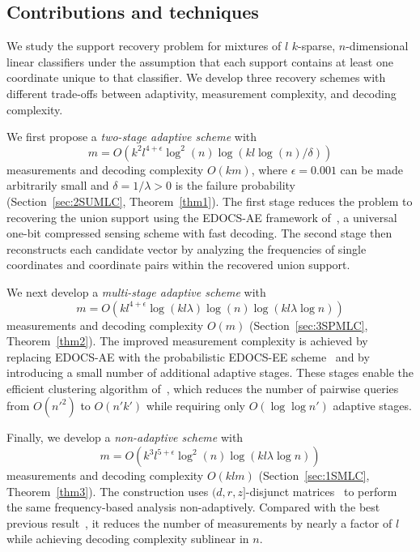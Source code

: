 \documentclass[10pt,a4paper]{amsart}
\begin{document}
\subsection{Contributions and techniques}

We study the support recovery problem for mixtures of $l$ $k$-sparse, $n$-dimensional linear classifiers under the assumption that each support contains at least one coordinate unique to that classifier. We develop three recovery schemes with different trade-offs between adaptivity, measurement complexity, and decoding complexity.

We first propose a {\em two-stage adaptive scheme} with
\[
m=O\!\left(k^2l^{4+\epsilon}\log^2(n)\log(kl\log(n)/\delta)\right)
\]
measurements and decoding complexity $O(km)$, where $\epsilon=0.001$ can be made arbitrarily small and $\delta=1/\lambda>0$ is the failure probability (Section~\ref{sec:2SUMLC}, Theorem~\ref{thm1}). The first stage reduces the problem to recovering the union support using the EDOCS-AE framework of~\cite{li2025support}, a universal one-bit compressed sensing scheme with fast decoding. The second stage then reconstructs each candidate vector by analyzing the frequencies of single coordinates and coordinate pairs within the recovered union support.

We next develop a {\em multi-stage adaptive scheme} with
\[
m=O\!\left(kl^{4+\epsilon}\log(kl\lambda)\log(n)\log(kl\lambda\log n)\right)
\]
measurements and decoding complexity $O(m)$ (Section~\ref{sec:3SPMLC}, Theorem~\ref{thm2}). The improved measurement complexity is achieved by replacing EDOCS-AE with the probabilistic EDOCS-EE scheme~\cite{li2025support} and by introducing a small number of additional adaptive stages. These stages enable the efficient clustering algorithm of~\cite{black2025learning}, which reduces the number of pairwise queries from $O(n'^2)$ to $O(n'k')$ while requiring only $O(\log\log n')$ adaptive stages.

Finally, we develop a {\em non-adaptive scheme} with
\[
m=O\!\left(k^3l^{5+\epsilon}\log^2(n)\log(kl\lambda\log n)\right)
\]
measurements and decoding complexity $O(klm)$ (Section~\ref{sec:1SMLC}, Theorem~\ref{thm3}). The construction uses $(d,r,z]$-disjunct matrices~\cite{chen2008upper} to perform the same frequency-based analysis non-adaptively. Compared with the best previous result~\cite{gandikota2020recovery}, it reduces the number of measurements by nearly a factor of $l$ while achieving decoding complexity sublinear in $n$.
\end{document}
